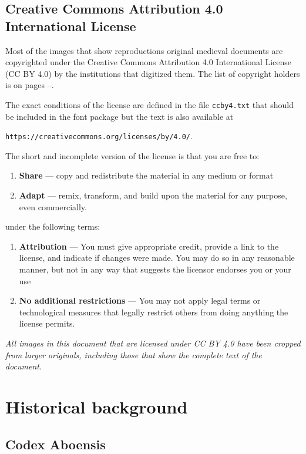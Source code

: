 \documentclass[a4paper]{article}
\begin{document}
\subsection{Creative Commons Attribution 4.0 International License}

Most of the images that show reproductions original medieval documents
are copyrighted under the Creative Commons Attribution 4.0
International License (CC BY 4.0) by the institutions that digitized
them. The list of copyright holders is on pages
\pageref{image_license_start}–\pageref{image_license_end}.

The exact conditions of the license are defined in the file
\texttt{ccby4.txt} that should be included in the font package but the
text is also available at
\begin{center}
\texttt{https://creativecommons.org/licenses/by/4.0/}.  
\end{center}
The short and incomplete version of the license is that you are free
to:
\begin{enumerate}
\item \textbf{Share} — copy and redistribute the material in any
  medium or format  
\item \textbf{Adapt} — remix, transform, and build upon the material
for any purpose, even commercially. 
\end{enumerate}
under the following terms:
\begin{enumerate}
\item \textbf{Attribution} — You must give appropriate credit, provide
  a link to the license, and indicate if changes were made. You may do
  so in any reasonable manner, but not in any way that suggests the
  licensor endorses you or your use
\item \textbf{No additional restrictions} — You may not apply legal
  terms or technological measures that legally restrict others from
  doing anything the license permits.  
\end{enumerate}

\emph{All images in this document that are licensed under CC BY 4.0
  have been cropped from larger originals, including those that show
  the complete text of the document.}



\section{Historical background}

\subsection{Codex Aboensis}
\end{document}

